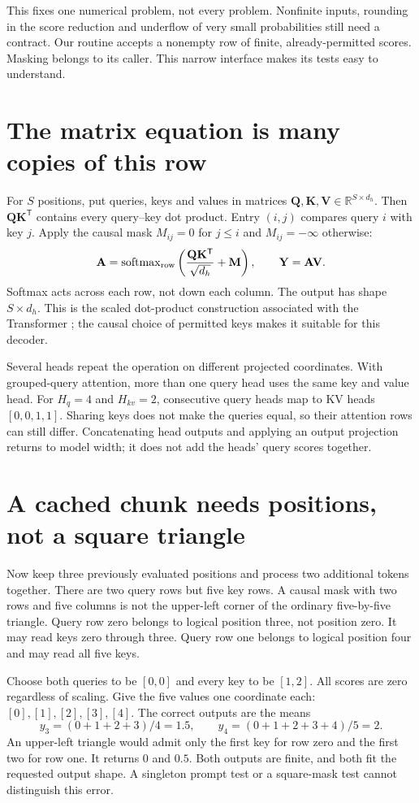 This fixes one numerical problem, not every problem. Nonfinite inputs,
rounding in the score reduction and underflow of very small probabilities
still need a contract. Our routine accepts a nonempty row of finite,
already-permitted scores. Masking belongs to its caller. This narrow
interface makes its tests easy to understand.

\section{The matrix equation is many copies of this row}
For $S$ positions, put queries, keys and values in matrices
$\mathbf Q,\mathbf K,\mathbf V\in\mathbb R^{S\times d_h}$. Then
$\mathbf Q\mathbf K^{\mathsf T}$ contains every query--key dot product.
Entry $(i,j)$ compares query $i$ with key $j$. Apply the causal mask
$M_{ij}=0$ for $j\le i$ and $M_{ij}=-\infty$ otherwise:
\[
 \mathbf A=\operatorname{softmax}_{\rm row}
 \left(\frac{\mathbf Q\mathbf K^{\mathsf T}}{\sqrt{d_h}}+\mathbf M\right),
 \qquad \mathbf Y=\mathbf A\mathbf V.
\]
Softmax acts across each row, not down each column. The output has shape
$S\times d_h$. This is the scaled dot-product construction associated with
the Transformer \cite{vaswani2017attention}; the causal choice of permitted
keys makes it suitable for this decoder.

Several heads repeat the operation on different projected coordinates.
With grouped-query attention, more than one query head uses the same key
and value head. For $H_q=4$ and $H_{kv}=2$, consecutive query heads map to
KV heads $[0,0,1,1]$. Sharing keys does not make the queries equal, so their
attention rows can still differ. Concatenating head outputs and applying an
output projection returns to model width; it does not add the heads' query
scores together.

\section{A cached chunk needs positions, not a square triangle}
Now keep three previously evaluated positions and process two additional
tokens together. There are two query rows but five key rows. A causal
mask with two rows and five columns is not the upper-left corner of the
ordinary five-by-five triangle. Query row zero belongs to logical position
three, not position zero. It may read keys zero through three. Query row
one belongs to logical position four and may read all five keys.

Choose both queries to be $[0,0]$ and every key to be $[1,2]$. All scores
are zero regardless of scaling. Give the five values one coordinate each:
$[0],[1],[2],[3],[4]$. The correct outputs are the means
\[
 y_3=(0+1+2+3)/4=1.5,\qquad
 y_4=(0+1+2+3+4)/5=2.
\]
An upper-left triangle would admit only the first key for row zero and
the first two for row one. It returns $0$ and $0.5$. Both outputs are
finite, and both fit the requested output shape. A singleton prompt test
or a square-mask test cannot distinguish this error.

